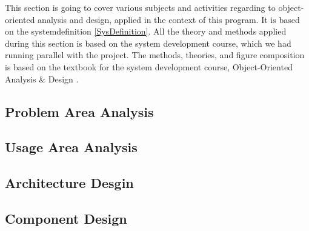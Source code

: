 This section is going to cover various subjects and activities regarding to object-oriented analysis and design, applied in the context of this program. It is based on the systemdefinition \ref{SysDefinition}. All the theory and methods applied during this section is based on the system development course, which we had running parallel with the project. The methods, theories, and figure composition is based on the textbook for the system development course, Object-Oriented Analysis \& Design \citep{ObjektAnalyseDesign}.

\subsection{Problem Area Analysis}
\label{ProblemArea}

\subsection{Usage Area Analysis}
\label{UsageArea}

\subsection{Architecture Desgin}
\label{ArchDes}

\subsection{Component Design}
\label{ComponentDesign}
